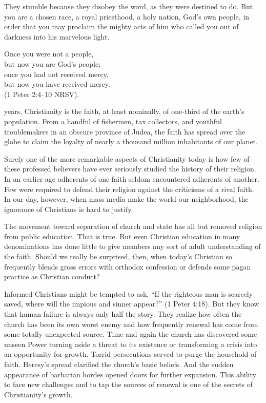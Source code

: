 They stumble because they disobey the word, as they were destined to do. But you are a chosen race,
a royal priesthood, a holy nation, God’s own people, in order that you may proclaim the mighty acts
of him who called you out of darkness into his marvelous light.

\begin{poem}
Once you were not a people,\\
but now you are God’s people;\\
once you had not received mercy,\\
but now you have received mercy.\\
(1 Peter 2:4–10 NRSV).
\end{poem}


 years, Christianity is the faith, at least nominally, of
one-third of the earth’s population. From a handful of fishermen, tax collectors, and youthful
troublemakers in an obscure province of Judea, the faith has spread over the globe to claim the
loyalty of nearly a thousand million inhabitants of our planet.

Surely one of the more remarkable aspects of Christianity today is how few of these professed
believers have ever seriously studied the history of their religion. In an earlier age adherents of
one faith seldom encountered adherents of another. Few were required to defend their religion
against the criticisms of a rival faith. In our day, however, when mass media make the world our
neighborhood, the ignorance of Christians is hard to justify.

The movement toward separation of church and state has all but removed religion from public
education. That is true. But even Christian education in many denominations has done little to give
members any sort of adult understanding of the faith. Should we really be surprised, then, when
today’s Christian so frequently blends gross errors with orthodox confession or defends some pagan
practice as Christian conduct?

Informed Christians might be tempted to ask, “If the righteous man is scarcely saved, where will the
impious and sinner appear?” (1 Peter 4:18). But they know that human failure is always only half the
story. They realize how often the church has been its own worst enemy and how frequently renewal has
come from some totally unexpected source. Time and again the church has discovered some unseen Power
turning aside a threat to its existence or transforming a crisis into an opportunity for growth.
Torrid persecutions served to purge the household of faith. Heresy’s spread clarified the church’s
basic beliefs. And the sudden appearance of barbarian hordes opened doors for further expansion.
This ability to face new challenges and to tap the sources of renewal is one of the secrets of
Christianity’s growth.

